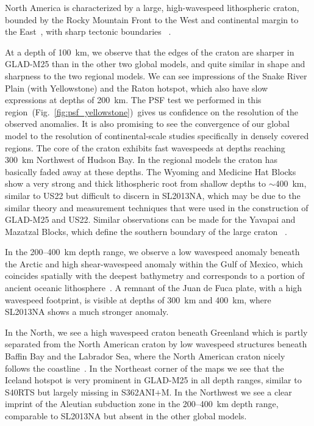 \documentclass[extra,mreferee]{gji}
\begin{document}
North America is characterized by a large, high-wavespeed lithospheric craton,
bounded by the Rocky Mountain Front to the West and continental
margin to the East~\citep{grand1984upper, whitmeyer2007tectonic},
with sharp tectonic boundaries
~\citep{masters1996shear, grand1997high, megnin2000three, gu2001models}.

At a depth of 100~km, we observe that the edges of the craton are sharper in
GLAD-M25 than in the other two global models,
and quite similar in shape and sharpness to the two regional models.
We can see impressions of the Snake River Plain (with Yellowstone)
and the Raton hotspot, which also have slow expressions at depths of 200~km. The PSF test we performed in this region~(Fig.~\ref{fig:psf_yellowstone})~gives us confidence on the resolution of the observed anomalies. It is also promising to see the convergence of our global model to the resolution of continental-scale studies specifically in densely covered regions.
The core of the craton exhibits fast wavespeeds at depths reaching 300~km Northwest of
Hudson Bay.
In the regional models the craton has basically faded away at these depths.
The Wyoming and Medicine Hat Blocks show a very strong and thick lithospheric
root from shallow depths to $\sim$400~km, similar to US22 but
difficult to discern in SL2013NA, which may be due to the similar theory and measurement techniques that were used in the construction of GLAD-M25 and US22.
Similar observations can be made for the Yavapai and
Mazatzal Blocks, which define the southern boundary of the large craton
~\citep{schaeffer2014imaging}.

In the 200--400~km depth range, we observe a low wavespeed anomaly beneath the Arctic
and high shear-wavespeed
anomaly within the Gulf of Mexico, which coincides spatially with the deepest
bathymetry and corresponds to a portion of ancient oceanic
lithosphere~\citep{muller2008, schaeffer2014imaging}.
A remnant of the Juan de Fuca plate,
with a high wavespeed footprint, is visible at depths of 300~km and 400~km,
where SL2013NA shows a much stronger anomaly.

In the North, we see a high wavespeed craton beneath Greenland which is partly
separated from the North American craton by low wavespeed structures beneath
Baffin Bay and the Labrador Sea, where the North American craton nicely follows
the coastline~\citep{chalmers2001development}.
In the Northeast corner of the maps we see that the Iceland hotspot is very
prominent in GLAD-M25 in all depth ranges, similar to S40RTS but largely missing
in S362ANI$+$M. In the Northwest we see a clear imprint of the Aleutian
subduction zone in the 200--400~km depth range, comparable to SL2013NA but absent
in the other global models.
\end{document}
